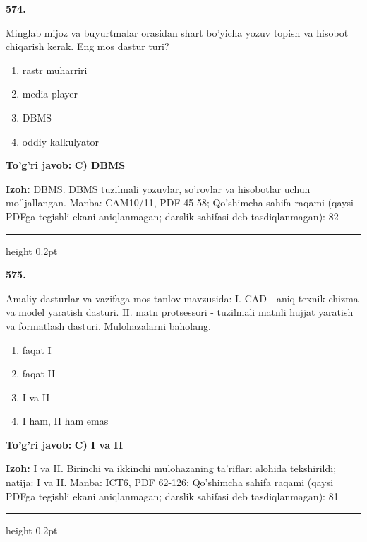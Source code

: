 \documentclass[10pt,a4paper]{article}
\begin{document}
{\bfseries\sffamily\color{ink} 574.}
\par
Minglab mijoz va buyurtmalar orasidan shart bo'yicha yozuv topish va hisobot chiqarish kerak. Eng mos dastur turi?
\begin{enumerate}[label=\Alph*),leftmargin=9mm]
\item rastr muharriri
\item media player
\item DBMS
\item oddiy kalkulyator
\end{enumerate}
\begin{tcolorbox}[enhanced,breakable,colback=teal!4,colframe=teal!60!black,boxrule=0.45pt,arc=1.2mm,left=2.7mm,right=2.7mm,top=1.8mm,bottom=1.8mm,before skip=2mm,after skip=2mm]
{\bfseries\sffamily\color{teal}To'g'ri javob:} \textbf{C) DBMS}
\par\smallskip
{\bfseries Izoh:} DBMS. DBMS tuzilmali yozuvlar, so'rovlar va hisobotlar uchun mo'ljallangan. Manba: CAM10/11, PDF 45-58; Qo'shimcha sahifa raqami (qaysi PDFga tegishli ekani aniqlanmagan; darslik sahifasi deb tasdiqlanmagan): 82
\end{tcolorbox}
\vspace{2mm}\hrule height 0.2pt\vspace{3mm}

{\bfseries\sffamily\color{ink} 575.}
\par
Amaliy dasturlar va vazifaga mos tanlov mavzusida: I. CAD - aniq texnik chizma va model yaratish dasturi. II. matn protsessori - tuzilmali matnli hujjat yaratish va formatlash dasturi. Mulohazalarni baholang.
\begin{enumerate}[label=\Alph*),leftmargin=9mm]
\item faqat I
\item faqat II
\item I va II
\item I ham, II ham emas
\end{enumerate}
\begin{tcolorbox}[enhanced,breakable,colback=teal!4,colframe=teal!60!black,boxrule=0.45pt,arc=1.2mm,left=2.7mm,right=2.7mm,top=1.8mm,bottom=1.8mm,before skip=2mm,after skip=2mm]
{\bfseries\sffamily\color{teal}To'g'ri javob:} \textbf{C) I va II}
\par\smallskip
{\bfseries Izoh:} I va II. Birinchi va ikkinchi mulohazaning ta'riflari alohida tekshirildi; natija: I va II. Manba: ICT6, PDF 62-126; Qo'shimcha sahifa raqami (qaysi PDFga tegishli ekani aniqlanmagan; darslik sahifasi deb tasdiqlanmagan): 81
\end{tcolorbox}
\vspace{2mm}\hrule height 0.2pt\vspace{3mm}
\end{document}
